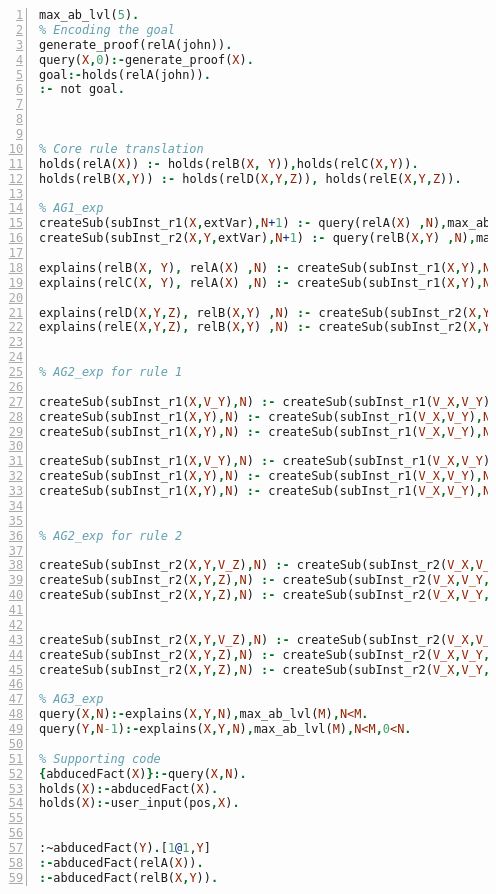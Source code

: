 \documentclass{article}
\begin{document}
\begin{lstlisting}[language=Prolog, numbers=left]
max_ab_lvl(5).
% Encoding the goal
generate_proof(relA(john)).
query(X,0):-generate_proof(X).
goal:-holds(relA(john)).
:- not goal.



% Core rule translation
holds(relA(X)) :- holds(relB(X, Y)),holds(relC(X,Y)).
holds(relB(X,Y)) :- holds(relD(X,Y,Z)), holds(relE(X,Y,Z)).

% AG1_exp
createSub(subInst_r1(X,extVar),N+1) :- query(relA(X) ,N),max_ab_lvl(M),N<M-1.
createSub(subInst_r2(X,Y,extVar),N+1) :- query(relB(X,Y) ,N),max_ab_lvl(M),N<M-1.

explains(relB(X, Y), relA(X) ,N) :- createSub(subInst_r1(X,Y),N).
explains(relC(X, Y), relA(X) ,N) :- createSub(subInst_r1(X,Y),N).

explains(relD(X,Y,Z), relB(X,Y) ,N) :- createSub(subInst_r2(X,Y,Z),N).
explains(relE(X,Y,Z), relB(X,Y) ,N) :- createSub(subInst_r2(X,Y,Z),N).


% AG2_exp for rule 1

createSub(subInst_r1(X,V_Y),N) :- createSub(subInst_r1(V_X,V_Y),N), holds(relA(X)).
createSub(subInst_r1(X,Y),N) :- createSub(subInst_r1(V_X,V_Y),N), holds(relB(X,Y)).
createSub(subInst_r1(X,Y),N) :- createSub(subInst_r1(V_X,V_Y),N), holds(relC(X,Y)).

createSub(subInst_r1(X,V_Y),N) :- createSub(subInst_r1(V_X,V_Y),N), query(relA(X),N-1),0<N.
createSub(subInst_r1(X,Y),N) :- createSub(subInst_r1(V_X,V_Y),N), query(relB(X,Y),N).
createSub(subInst_r1(X,Y),N) :- createSub(subInst_r1(V_X,V_Y),N), query(relC(X,Y),N).


% AG2_exp for rule 2

createSub(subInst_r2(X,Y,V_Z),N) :- createSub(subInst_r2(V_X,V_Y,V_Z),N), holds(relB(X,Y)).
createSub(subInst_r2(X,Y,Z),N) :- createSub(subInst_r2(V_X,V_Y,V_Z),N), holds(relD(X,Y,Z)).
createSub(subInst_r2(X,Y,Z),N) :- createSub(subInst_r2(V_X,V_Y,V_Z),N), holds(relE(X,Y,Z)).


createSub(subInst_r2(X,Y,V_Z),N) :- createSub(subInst_r2(V_X,V_Y,V_Z),N), query(relB(X,Y),N-1),0<N.
createSub(subInst_r2(X,Y,Z),N) :- createSub(subInst_r2(V_X,V_Y,V_Z),N), query(relD(X,Y,Z),N).
createSub(subInst_r2(X,Y,Z),N) :- createSub(subInst_r2(V_X,V_Y,V_Z),N), query(relE(X,Y,Z),N).

% AG3_exp
query(X,N):-explains(X,Y,N),max_ab_lvl(M),N<M.
query(Y,N-1):-explains(X,Y,N),max_ab_lvl(M),N<M,0<N.

% Supporting code
{abducedFact(X)}:-query(X,N).
holds(X):-abducedFact(X).
holds(X):-user_input(pos,X).


:~abducedFact(Y).[1@1,Y]
:-abducedFact(relA(X)).
:-abducedFact(relB(X,Y)).

\end{lstlisting}
\end{document}
